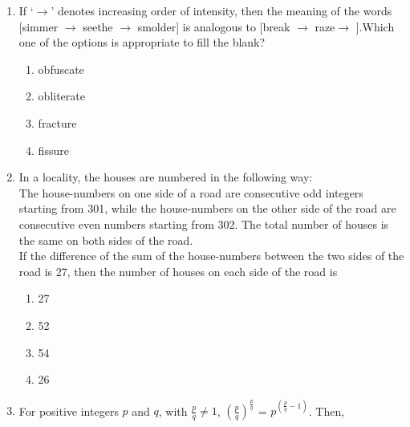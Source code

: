 \documentclass[a4paper,12pt]{exam}
\numberwithin{equation}{enumi}
\numberwithin{figure}{enumi}
\begin{document}
\vspace*{-0.5cm}
\vspace{0.75cm}
\begin{enumerate}
\item If `$\longrightarrow$' denotes increasing order of intensity, then the meaning of the words [simmer $\longrightarrow$ seethe $\longrightarrow$ smolder] is analogous to [break $\longrightarrow$ raze$\longrightarrow$ \underline{\hspace{1cm}}].Which one of the options is appropriate to fill the blank?

\hfill{}

\begin{multicols}{4}
\begin{enumerate}
\item obfuscate
\item obliterate
\item fracture
\item fissure
\end{enumerate}
\end{multicols}


\item In a  locality, the houses are numbered in the following way:\\[8pt] The house-numbers on one side of a road are consecutive odd integers starting from 301, while the house-numbers on the other side of the road are consecutive even 
 numbers starting from 302. The total number of houses is the same on both sides of the road.\\[8pt] If the difference of the sum of the house-numbers between the two sides of the road is 27, then the number of houses on each side of the road is 

\hfill{}

\begin{multicols}{4}
\begin{enumerate}
\item 27
\item 52
\item 54
\item 26
\end{enumerate}
\end{multicols}

\item For positive integers $p$ and $q$, with $\frac{p}{q}\ne 1$, $\left(\frac{p}{q}\right)^{\frac{p}{q}}$ = $p^{\left(\frac{p}{q}-1\right)}$. Then,


\end{enumerate}
\end{document}
